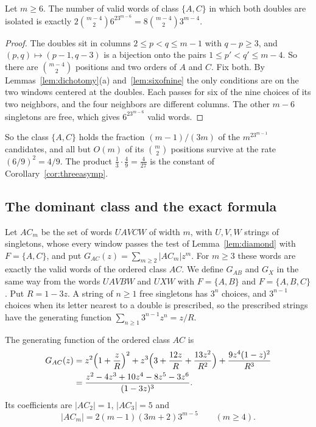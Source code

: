 \begin{proposition}\label{prop:dominant}
Let $m\ge6$. The number of valid words of class $\{A,C\}$ in which both doubles are isolated is
exactly $2\binom{m-4}26^23^{m-6}=8\binom{m-4}23^{m-4}$.
\end{proposition}

\begin{proof}
The doubles sit in columns $2\le p<q\le m-1$ with $q-p\ge3$, and $(p,q)\mapsto(p-1,q-3)$ is a
bijection onto the pairs $1\le p'<q'\le m-4$. So there are $\binom{m-4}2$ positions and two
orders of $A$ and $C$. Fix both. By Lemmas~\ref{lem:dichotomy}(a) and~\ref{lem:sixofnine} the
only conditions are on the two windows centered at the doubles. Each passes for six of the
nine choices of its two neighbors, and the four neighbors are different columns. The other
$m-6$ singletons are free, which gives $6^23^{m-6}$ valid words.
\end{proof}

So the class $\{A,C\}$ holds the fraction $(m-1)/(3m)$ of the $m^23^{m-1}$ candidates, and
all but $O(m)$ of its $\binom m2$ positions survive at the rate $(6/9)^2=4/9$. The product
$\frac13\cdot\frac49=\frac4{27}$ is the constant of Corollary~\ref{cor:threeasymp}.

\subsection{The dominant class and the exact formula}

Let $AC_m$ be the set of words $UAVCW$ of width $m$, with $U,V,W$ strings of singletons,
whose every window passes the test of Lemma~\ref{lem:diamond} with $F=\{A,C\}$, and put
$G_{AC}(z)=\sum_{m\ge2}|AC_m|z^m$. For $m\ge3$ these words are exactly the valid words of the
ordered class $AC$. We define $G_{AB}$ and $G_X$ in the same way from the words $UAVBW$ and
$UXW$ with $F=\{A,B\}$ and $F=\{A,B,C\}$. Put $R=1-3z$. A string of $n\ge1$ free singletons
has $3^n$ choices, and $3^{n-1}$ choices when its letter nearest to a double is prescribed,
so the prescribed strings have the generating function $\sum_{n\ge1}3^{n-1}z^n=z/R$.

\begin{proposition}\label{prop:threeGAC}
The generating function of the ordered class $AC$ is
\begin{align}
G_{AC}(z)&=z^2\Bigl(1+\frac zR\Bigr)^2+z^3\Bigl(3+\frac{12z}R+\frac{13z^2}{R^2}\Bigr)
+\frac{9z^4(1-z)^2}{R^3}\label{eq:GAC}\\
&=\frac{z^2-4z^3+10z^4-8z^5-3z^6}{(1-3z)^3}.\nonumber
\end{align}
Its coefficients are $|AC_2|=1$, $|AC_3|=5$ and
\begin{equation}\label{eq:GACcoef}
|AC_m|=2(m-1)(3m+2)3^{m-5}\qquad(m\ge4).
\end{equation}
\end{proposition}


